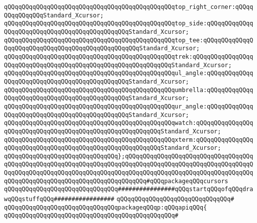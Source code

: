 \verb|qQQqqQQqqQQqqQQqqQQqqQQqqQQqqQQqqQQqqQQqqQQqqQQqtop_right_corner:qQQqqQQqqQQqqQQqStandard_Xcursor;|\newline
\verb|qQQqqQQqqQQqqQQqqQQqqQQqqQQqqQQqqQQqqQQqqQQqqQQqtop_side:qQQqqQQqqQQqqQQqqQQqqQQqqQQqqQQqqQQqqQQqqQQqqQQqStandard_Xcursor;|\newline
\verb|qQQqqQQqqQQqqQQqqQQqqQQqqQQqqQQqqQQqqQQqqQQqqQQqtop_tee:qQQqqQQqqQQqqQQqqQQqqQQqqQQqqQQqqQQqqQQqqQQqqQQqqQQqStandard_Xcursor;|\newline
\verb|qQQqqQQqqQQqqQQqqQQqqQQqqQQqqQQqqQQqqQQqqQQqqQQqtrek:qQQqqQQqqQQqqQQqqQQqqQQqqQQqqQQqqQQqqQQqqQQqqQQqqQQqqQQqqQQqqQQqStandard_Xcursor;|\newline
\verb|qQQqqQQqqQQqqQQqqQQqqQQqqQQqqQQqqQQqqQQqqQQqqQQqul_angle:qQQqqQQqqQQqqQQqqQQqqQQqqQQqqQQqqQQqqQQqqQQqqQQqStandard_Xcursor;|\newline
\verb|qQQqqQQqqQQqqQQqqQQqqQQqqQQqqQQqqQQqqQQqqQQqqQQqumbrella:qQQqqQQqqQQqqQQqqQQqqQQqqQQqqQQqqQQqqQQqqQQqqQQqStandard_Xcursor;|\newline
\verb|qQQqqQQqqQQqqQQqqQQqqQQqqQQqqQQqqQQqqQQqqQQqqQQqur_angle:qQQqqQQqqQQqqQQqqQQqqQQqqQQqqQQqqQQqqQQqqQQqqQQqStandard_Xcursor;|\newline
\verb|qQQqqQQqqQQqqQQqqQQqqQQqqQQqqQQqqQQqqQQqqQQqqQQqwatch:qQQqqQQqqQQqqQQqqQQqqQQqqQQqqQQqqQQqqQQqqQQqqQQqqQQqqQQqqQQqStandard_Xcursor;|\newline
\verb|qQQqqQQqqQQqqQQqqQQqqQQqqQQqqQQqqQQqqQQqqQQqqQQqxterm:qQQqqQQqqQQqqQQqqQQqqQQqqQQqqQQqqQQqqQQqqQQqqQQqqQQqqQQqqQQqStandard_Xcursor;|\newline
\verb|qQQqqQQqqQQqqQQqqQQqqQQqqQQqqQQq};qQQqqQQqqQQqqQQqqQQqqQQqqQQqqQQqqQQqqQQqqQQqqQQqqQQqqQQqqQQqqQQqqQQqqQQqqQQqqQQqqQQqqQQqqQQqqQQqqQQqqQQqqQQqqQQqqQQqqQQqqQQqqQQqqQQqqQQqqQQqqQQqqQQqqQQqqQQqqQQqqQQqqQQqqQQqqQQqqQQqqQQqqQQqqQQqqQQqqQQqqQQqqQQqqQQqqQQq#qQQqpackageqQQqcursors|\newline
\newline
\newline
\newline
\verb|qQQqqQQqqQQqqQQqqQQqqQQqqQQqqQQq################qQQqstartqQQqofqQQqdrawqQQqstuffqQQq#################|\newline
\verb|qQQqqQQqqQQqqQQqqQQqqQQqqQQqqQQq#|\newline
\newline
\verb|qQQqqQQqqQQqqQQqqQQqqQQqqQQqqQQqpackageqQQqp:qQQqapiqQQq{|\newline
\verb|qQQqqQQqqQQqqQQqqQQqqQQqqQQqqQQqqQQqqQQqqQQqqQQq#|\newline
